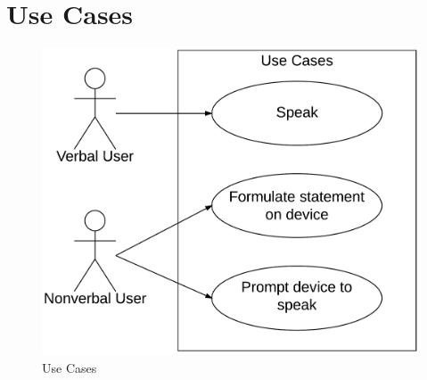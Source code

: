 \chapter{Use Cases}

\begin{figure}[htb]
\centering
\includegraphics[width=\textwidth]{UseCases.png}
\caption{Use Cases}
\label{fig:useCases}
\end{figure}